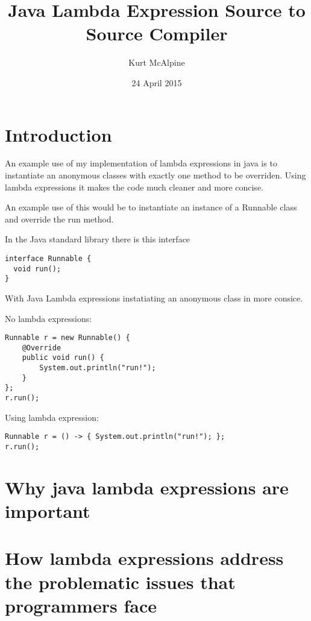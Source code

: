 \documentclass[twocolumn,notitlepage]{report}
\begin{document}
\title{Java Lambda Expression Source to Source Compiler}
\author{Kurt McAlpine}
\date{24 April 2015}
\maketitle

\section*{Introduction}
An example use of my implementation of lambda expressions in java is to
instantiate an anonymous classes with exactly one method to be overriden. Using
lambda expressions it makes the code much cleaner and more concise.

An example use of this would be to instantiate an instance of a Runnable class
and override the run method.\cite{Ierusalimschy:2007:EL:1238844.1238846}

In the Java standard library there is this interface
\begin{lstlisting}
interface Runnable {
  void run();
}
\end{lstlisting}
With Java Lambda expressions instatiating an anonymous class in more consice.

No lambda expressions:
\begin{lstlisting}
Runnable r = new Runnable() {
	@Override
	public void run() {
		System.out.println("run!");
	}
};
r.run();
\end{lstlisting}
Using lambda expression:
\begin{lstlisting}
Runnable r = () -> { System.out.println("run!"); };    	
r.run();
\end{lstlisting}

\section*{Why java lambda expressions are important}

\section*{How lambda expressions address the problematic issues that programmers face}



\end{document}
